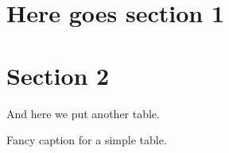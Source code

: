 \documentclass{article}
\begin{document}
\section{Here goes section 1}
\lipsum[1]



\section{Section 2}
And here we put another table.

 \begin{table}
   \centering
   \pgfplotstabletypeset[%
     columns={a,b,c,d,e},
     string type
     ]{\loadeddatatwo}
     \caption{Fancy caption for a simple table.}
     \label{tab:table2}
 \end{table}
\end{document}
